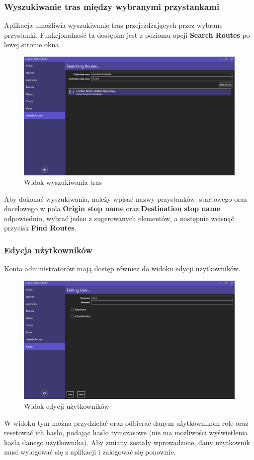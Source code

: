 \documentclass[10pt,a4paper]{article}
\begin{document}
\subsubsection{Wyszukiwanie tras między wybranymi przystankami}
Aplikacja umożliwia wyszukiwanie tras przejeżdżających przez wybrane przystanki. Funkcjonalność ta dostępna jest z poziomu opcji \textbf{Search Routes} po lewej stronie okna.
\begin{figure}[H]
	\centering
	\includegraphics[width=15cm]{Resources/Images/23_search_routes.PNG}
	\caption{Widok wyszukiwania tras}
\end{figure}
Aby dokonać wyszukiwania, należy wpisać nazwy przystanków: startowego oraz docelowego w pola \textbf{Origin stop name} oraz \textbf{Destination stop name} odpowiednio, wybrać jeden z sugerowanych elementów, a następnie wcisnąć przycisk \textbf{Find Routes}.

\subsubsection{Edycja użytkowników}
Konta administratorów mają dostęp również do widoku edycji użytkowników.
\begin{figure}[H]
	\centering
	\includegraphics[width=15cm]{Resources/Images/19_edit_user.png}
	\caption{Widok edycji użytkowników}
\end{figure}
W widoku tym można przydzielać oraz odbierać danym użytkownikom role oraz resetować ich hasło, podając hasło tymczasowe (nie ma możliwości wyświetlenia hasła danego użytkownika). Aby zmiany zostały wprowadzone, dany użytkownik musi wylogować się z aplikacji i zalogować się ponownie.
\end{document}
